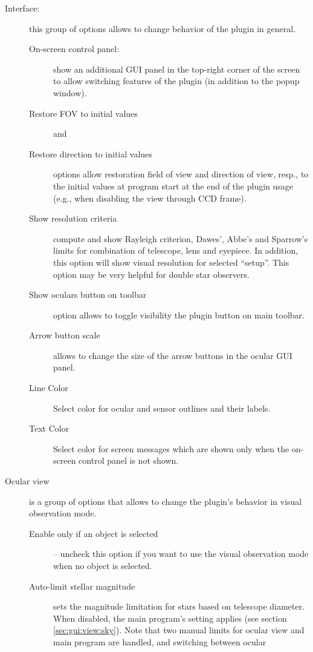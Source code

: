 \begin{description}
\item[Interface:] this group of options allows to change behavior of the plugin in general.
 \begin{description}
   \item[On-screen control panel:] show an additional GUI panel in the top-right corner of the screen to allow switching features of the plugin (in addition to the popup window).
   \item[Restore FOV to initial values] and
   \item[Restore direction to initial values] options allow restoration field of view and direction of view, resp., 
         to the initial values at program start at the end of the plugin usage (e.g., when disabling the view through CCD frame).
   \item[Show resolution criteria] compute and show Rayleigh criterion, Dawes', Abbe's and Sparrow's limits for combination of telescope, lens and eyepiece.
         In addition, this option will show visual resolution for selected ``setup''. This option may be very helpful for double star observers.
   \item[Show oculars button on toolbar] option allows to toggle visibility the plugin button on main toolbar. 
   \item[Arrow button scale] allows to change the size of the arrow buttons in the ocular GUI panel. 
   \item[Line Color] Select  color for ocular and sensor outlines and their labels.
   \item[Text Color] Select  color for screen messages which are shown only when the on-screen control panel is not shown.
 \end{description}
\item[Ocular view] is a group of options that allows to change the plugin's behavior in visual observation mode.
 \begin{description}
   \item[Enable only if an object is selected] -- uncheck this option if you want to use the visual observation mode when no object is selected.
   \item[Auto-limit stellar magnitude] sets the magnitude limitation
     for stars based on telescope diameter. When disabled, the main
     program's setting applies (see section
     \ref{sec:gui:view:sky}).  Note that two manual limits for ocular
     view and main program are handled, and switching between ocular

\end{description}
\end{description}
